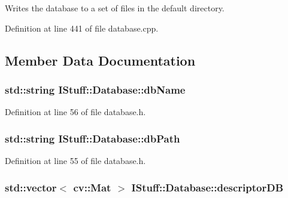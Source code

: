 Writes the database to a set of files in the default directory. 



Definition at line 441 of file database.\-cpp.



\subsection{Member Data Documentation}
\hypertarget{class_i_stuff_1_1_database_a4e8d5c6cbf4e5eaafe379cd5762fd76f}{
\subsubsection[{db\-Name}]{\setlength{\rightskip}{0pt plus 5cm}std\-::string I\-Stuff\-::\-Database\-::db\-Name\hspace{0.3cm}{\ttfamily [private]}}}\label{class_i_stuff_1_1_database_a4e8d5c6cbf4e5eaafe379cd5762fd76f}


Definition at line 56 of file database.\-h.

\hypertarget{class_i_stuff_1_1_database_ae648dcc6da59f19955681584028fef99}{
\subsubsection[{db\-Path}]{\setlength{\rightskip}{0pt plus 5cm}std\-::string I\-Stuff\-::\-Database\-::db\-Path\hspace{0.3cm}{\ttfamily [private]}}}\label{class_i_stuff_1_1_database_ae648dcc6da59f19955681584028fef99}


Definition at line 55 of file database.\-h.

\hypertarget{class_i_stuff_1_1_database_a6af39e0cf95b7a14c331911bf388bf65}{
\subsubsection[{descriptor\-D\-B}]{\setlength{\rightskip}{0pt plus 5cm}std\-::vector$<$ cv\-::\-Mat $>$ I\-Stuff\-::\-Database\-::descriptor\-D\-B\hspace{0.3cm}{\ttfamily [private]}}}\label{class_i_stuff_1_1_database_a6af39e0cf95b7a14c331911bf388bf65}


